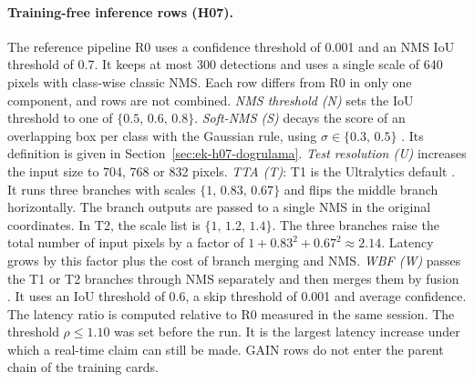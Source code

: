 \paragraph{Training-free inference rows (H07).}
The reference pipeline R0 uses a confidence threshold of 0.001 and an NMS IoU threshold of 0.7. It keeps at most 300 detections and uses a single scale of 640 pixels with class-wise classic NMS. Each row differs from R0 in only one component, and rows are not combined. \emph{NMS threshold (N)} sets the IoU threshold to one of $\{0.5,\,0.6,\,0.8\}$. \emph{Soft-NMS (S)} decays the score of an overlapping box per class with the Gaussian rule, using $\sigma\in\{0.3,\,0.5\}$ \cite{bodla_2017_softnms}. Its definition is given in Section~\ref{sec:ek-h07-dogrulama}. \emph{Test resolution (U)} increases the input size to 704, 768 or 832 pixels. \emph{TTA (T)}: T1 is the Ultralytics default \cite{ultralytics_2026_yolov5tta,ultralytics_2026_v84165}. It runs three branches with scales $\{1,\,0.83,\,0.67\}$ and flips the middle branch horizontally. The branch outputs are passed to a single NMS in the original coordinates. In T2, the scale list is $\{1,\,1.2,\,1.4\}$. The three branches raise the total number of input pixels by a factor of $1+0.83^2+0.67^2\approx2.14$. Latency grows by this factor plus the cost of branch merging and NMS. \emph{WBF (W)} passes the T1 or T2 branches through NMS separately and then merges them by fusion \cite{solovyev_2021_wbf}. It uses an IoU threshold of 0.6, a skip threshold of 0.001 and average confidence. The latency ratio is computed relative to R0 measured in the same session. The threshold $\rho\le1.10$ was set before the run. It is the largest latency increase under which a real-time claim can still be made. GAIN rows do not enter the parent chain of the training cards.


